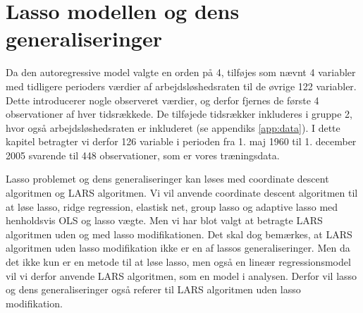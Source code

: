 \chapter{Lasso modellen og dens generaliseringer} \label{ch:shrinkage_metoder}
Da den autoregressive model valgte en orden på 4, tilføjes som nævnt 
4 variabler med tidligere perioders værdier af arbejdsløshedsraten til de øvrige 122 variabler. 
Dette introducerer nogle observeret værdier, og derfor fjernes de første 4 observationer af hver tidsrækkede.
De tilføjede tidsrækker inkluderes i gruppe 2, hvor også arbejdsløshedsraten er inkluderet (se appendiks \ref{app:data}).
I dette kapitel betragter vi derfor 126 variable i perioden fra 1. maj 1960 til 1. december 2005 svarende til 448 observationer, som er vores træningsdata. 

Lasso problemet og dens generaliseringer kan løses med coordinate descent algoritmen og LARS algoritmen.
Vi vil anvende coordinate descent algoritmen til at løse lasso, ridge regression, elastisk net, group lasso og adaptive lasso med henholdsvis OLS og lasso vægte.
Men vi har blot valgt at betragte LARS algoritmen uden og med lasso modifikationen.
Det skal dog bemærkes, at LARS algoritmen uden lasso modifikation ikke er en af lassos generaliseringer. Men da det ikke kun er en metode til at løse lasso, men også en lineær regressionsmodel vil vi derfor anvende LARS algoritmen, som en model i analysen.  Derfor vil lasso og dens generaliseringer også referer til LARS algoritmen uden lasso modifikation.  



